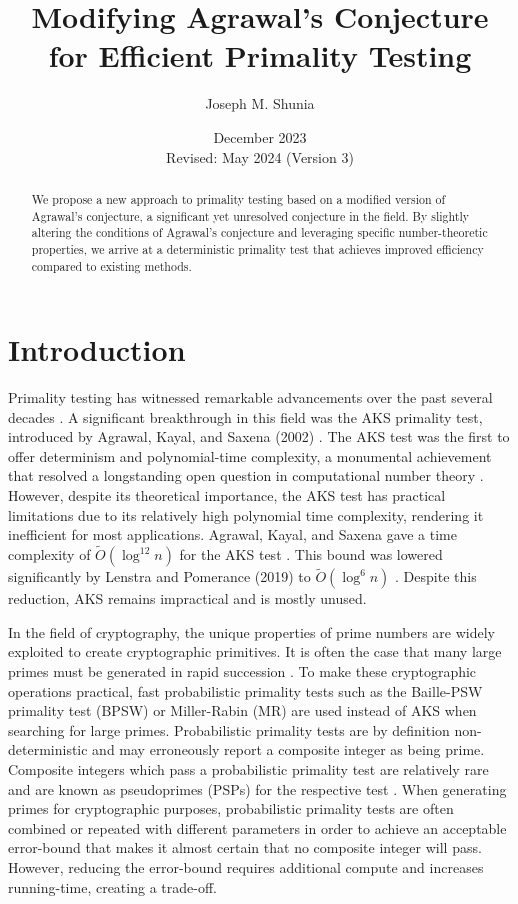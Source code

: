 \documentclass{article}
\title{Modifying Agrawal's Conjecture for Efficient Primality Testing}
\author{Joseph M. Shunia}
\date{December 2023 \\ \small Revised: May 2024 (Version 3) \normalsize}
\theoremstyle{plain}
\theoremstyle{definition}
\begin{document}
\maketitle

\begin{abstract}
We propose a new approach to primality testing based on a modified version of Agrawal's conjecture, a significant yet unresolved conjecture in the field. By slightly altering the conditions of Agrawal's conjecture and leveraging specific number-theoretic properties, we arrive at a deterministic primality test that achieves improved efficiency compared to existing methods.
\end{abstract}

\section{Introduction}
Primality testing has witnessed remarkable advancements over the past several decades \cite{miller1976, baillie1980, rabin1980, wagstaff1982pseudoprimes, aks2002}. A significant breakthrough in this field was the AKS primality test, introduced by Agrawal, Kayal, and Saxena (2002) \cite{aks2002}. The AKS test was the first to offer determinism and polynomial-time complexity, a monumental achievement that resolved a longstanding open question in computational number theory \cite{goldreich2008}. However, despite its theoretical importance, the AKS test has practical limitations due to its relatively high polynomial time complexity, rendering it inefficient for most applications. Agrawal, Kayal, and Saxena gave a time complexity of $\tilde{O}(\log^{12} n)$ for the AKS test \cite{aks2002}. This bound was lowered significantly by Lenstra and Pomerance (2019) to $\tilde{O}(\log^6 n)$ \cite{lenstra2019gaussian}. Despite this reduction, AKS remains impractical and is mostly unused.

In the field of cryptography, the unique properties of prime numbers are widely exploited to create cryptographic primitives. It is often the case that many large primes must be generated in rapid succession \cite{lenstra1987elliptic}. To make these cryptographic operations practical, fast probabilistic primality tests such as the Baille-PSW primality test (BPSW) \cite{baillie1980} or Miller-Rabin (MR) \cite{miller1976, rabin1980} are used instead of AKS when searching for large primes. Probabilistic primality tests are by definition non-deterministic and may erroneously report a composite integer as being prime. Composite integers which pass a probabilistic primality test are relatively rare and are known as pseudoprimes (PSPs) for the respective test \cite{wagstaff1982pseudoprimes}. When generating primes for cryptographic purposes, probabilistic primality tests are often combined or repeated with different parameters in order to achieve an acceptable error-bound that makes it almost certain that no composite integer will pass. However, reducing the error-bound requires additional compute and increases running-time, creating a trade-off.
\end{document}
